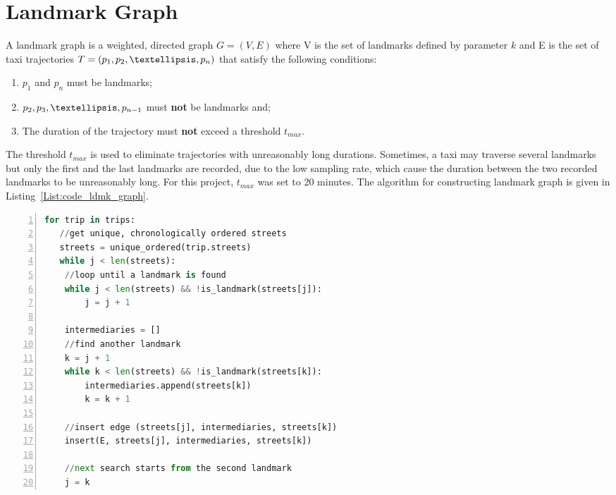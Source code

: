 \section{Landmark Graph}\label{ldmk_graph}
\begin{defn}\label{Def:ldmk_graph}
A landmark graph is a weighted, directed graph $G=(V,E)$ where V is the set of landmarks defined by parameter $k$ and E is the set of taxi trajectories $T = (p_1,p_2,\textellipsis,p_n)$ that satisfy the following conditions:
\begin{enumerate}
\item $p_1$ and $p_n$ must be landmarks; 
\item $p_2, p_3, \textellipsis , p_{n-1}$ must \textbf{not} be landmarks and;
\item The duration of the trajectory must \textbf{not} exceed a threshold $t_{max}$.
\end{enumerate}
\end{defn}

The threshold $t_{max}$ is used to eliminate trajectories with unreasonably long du\-rations\cite{TDR10}. Sometimes, a taxi may traverse several landmarks but only the first and the last landmarks are recorded, due to the low sampling rate, which cause the duration between the two recorded landmarks to be unreasonably long. For this project, $t_{max}$ was set to 20 minutes. The algorithm for constructing landmark graph is given in Listing~\ref{List:code_ldmk_graph}.

\begin{lstlisting}[language = Python, caption = {Pseudocode for constructing landmark graph}, label = {List:code_ldmk_graph}, frame=single, numbers=left, stepnumber=1]
for trip in trips:
   //get unique, chronologically ordered streets
   streets = unique_ordered(trip.streets)
   while j < len(streets):
	//loop until a landmark is found
	while j < len(streets) && !is_landmark(streets[j]):
		j = j + 1
		
	intermediaries = []
	//find another landmark
	k = j + 1
	while k < len(streets) && !is_landmark(streets[k]):
		intermediaries.append(streets[k])
		k = k + 1
		
	//insert edge (streets[j], intermediaries, streets[k])
	insert(E, streets[j], intermediaries, streets[k])
		
	//next search starts from the second landmark
	j = k
\end{lstlisting}

